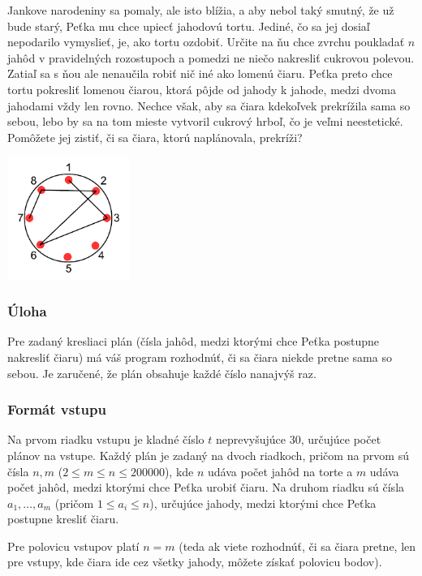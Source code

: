 Jankove narodeniny sa pomaly, ale isto blížia, a aby nebol taký smutný,
že už bude starý, Peťka mu chce upiecť jahodovú tortu. Jediné, čo sa jej
dosiaľ nepodarilo vymyslieť, je, ako tortu ozdobiť. Určite na ňu chce
zvrchu poukladať $n$ jahôd v pravidelných rozostupoch a pomedzi ne niečo
nakresliť cukrovou polevou. Zatiaľ sa s ňou ale nenaučila robiť nič iné
ako lomenú čiaru. Peťka preto chce tortu pokresliť lomenou čiarou, ktorá
pôjde od jahody k jahode, medzi dvoma jahodami vždy len rovno. Nechce
však, aby sa čiara kdekoľvek prekrížila sama so sebou, lebo by sa na tom
mieste vytvoril cukrový hrboľ, čo je veľmi neestetické. Pomôžete jej
zistiť, či sa čiara, ktorú naplánovala, prekríži?

\centerline{\includegraphics[height = 4cm]{sources/torta.pdf}}

\subsubsection{Úloha}

Pre zadaný kresliaci plán (čísla jahôd, medzi ktorými chce Peťka
postupne nakresliť čiaru) má váš program rozhodnúť, či sa čiara niekde
pretne sama so sebou. Je zaručené, že plán obsahuje každé číslo nanajvýš
raz.

\subsubsection{Formát vstupu}

Na prvom riadku vstupu je kladné číslo $t$ neprevyšujúce 30, určujúce
počet plánov na vstupe. Každý plán je zadaný na dvoch riadkoch, pričom
na prvom sú čísla $n, m$ ($2 \leq m \leq n \leq \num{200000}$), kde $n$
udáva počet jahôd na torte a $m$ udáva počet jahôd, medzi ktorými chce
Peťka urobiť čiaru. Na druhom riadku sú čísla $a_1, \dots, a_m$ (pričom
$1 \leq a_i \leq n$), určujúce jahody, medzi ktorými chce Peťka postupne
kresliť čiaru.

Pre polovicu vstupov platí $n = m$ (teda ak viete rozhodnúť, či sa čiara
pretne, len pre vstupy, kde čiara ide cez všetky jahody, môžete získať
polovicu bodov).

